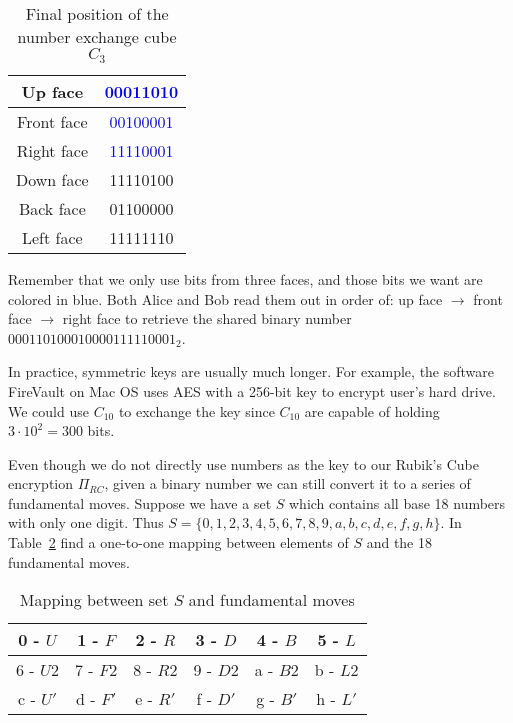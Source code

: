 \begin{table}[ht]
    \centering
    \begin{tabular}{|c|c|}
        \hline Up face & \textcolor{blue}{00011010}  \\
        \hline Front face & \textcolor{blue}{00100001}  \\
        \hline Right face & \textcolor{blue}{11110001}  \\
        \hline Down face & 11110100  \\
        \hline Back face & 01100000  \\
        \hline Left face & 11111110  \\ \hline
    \end{tabular}
    \caption{Final position of the number exchange cube $C_3$}
    \label{tab:exchange-final-bit}
\end{table}
Remember that we only use bits from three faces, and those bits we want are colored in blue. Both Alice and Bob read them out in order of: up face $\rightarrow$ front face $\rightarrow$ right face to retrieve the shared binary number $000110100010000111110001_2$.
\par In practice, symmetric keys are usually much longer. For example, the software FireVault on Mac OS uses AES with a 256-bit key to encrypt user's hard drive. We could use $C_{10}$ to exchange the key since $C_{10}$ are capable of holding $3 \cdot 10^2 = 300$ bits.  
\par Even though we do not directly use numbers as the key to our Rubik's Cube encryption $\Pi_{RC}$, given a binary number we can still convert it to a series of fundamental moves. Suppose we have a set $S$ which contains all base 18 numbers with only one digit. Thus $S = \{0, 1, 2, 3, 4, 5, 6, 7, 8, 9, a, b, c, d, e, f, g, h\}$. In Table~\ref{tab:map-move} find a one-to-one mapping between elements of $S$ and the 18 fundamental moves.
\begin{table}[ht]
    \centering
    \begin{tabular}{|c|c|c|c|c|c|}
        \hline 0 - $U$ & 1 - $F$ & 2 - $R$ & 3 - $D$ & 4 - $B$ & 5 - $L$ \\
        \hline 6 - $U2$ & 7 - $F2$ & 8 - $R2$ & 9 - $D2$ & a - $B2$ & b - $L2$ \\
        \hline c - $U'$ & d - $F'$ & e - $R'$ & f - $D'$ & g - $B'$ & h - $L'$ \\ \hline
    \end{tabular}
    \caption{Mapping between set $S$ and fundamental moves}
    \label{tab:map-move}
\end{table}

